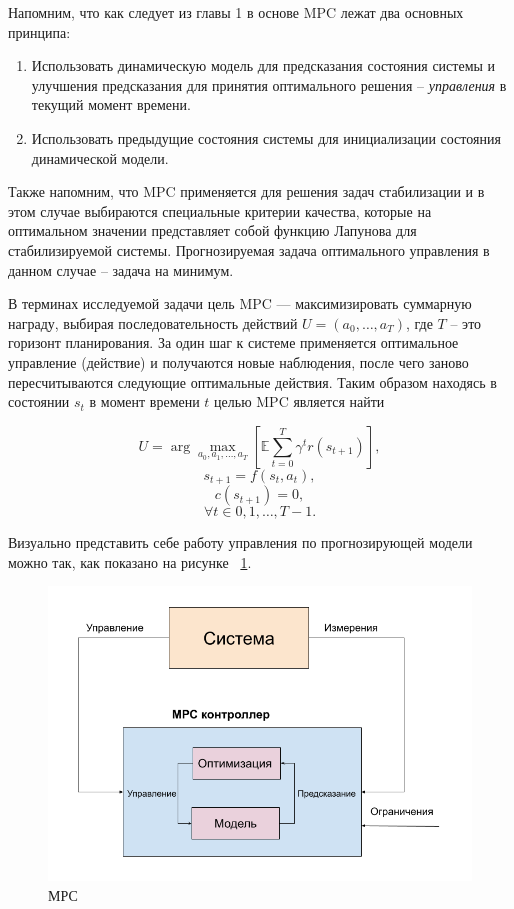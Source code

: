 Напомним, что как следует из главы 1 в основе MPC лежат два основных принципа:
\begin{enumerate}
	\item Использовать динамическую модель для предсказания состояния системы и улучшения предсказания для принятия оптимального решения -- \textit{управления} в текущий момент времени.
	
	\item Использовать предыдущие состояния системы для инициализации состояния динамической модели.
\end{enumerate}

Также напомним, что MPC применяется для решения задач стабилизации и в этом случае выбираются специальные критерии качества, которые на оптимальном значении представляет собой функцию Лапунова для стабилизируемой системы. Прогнозируемая задача оптимального управления в данном случае -- задача на минимум.

В терминах исследуемой задачи цель MPC — максимизировать суммарную награду, выбирая последовательность действий $U=(a_0, \dots, a_T)$, где $T$ -- это горизонт планирования. За один шаг к системе применяется оптимальное управление (действие) и  получаются новые наблюдения, после чего заново пересчитываются следующие оптимальные действия. Таким образом находясь в состоянии $s_t$ в момент времени $t$ целью MPC является найти

\begin{equation}
	U = \arg \max_{a_0, a_1, \dots, a_T} [ \mathbb{E}  \sum \limits_{t=0}^{T} \gamma^t r(s_{t+1})] , 
\end{equation}
$$s_{t+1} = f(s_t, a_t),$$
$$c(s_{t+1}) = 0,$$
$$\forall t \in {0, 1, \dots, T-1}. $$


Визуально представить себе работу управления по прогнозирующей модели можно так, как показано на рисунке ~\ref{fig:mpc-ex}. \newpage

\begin{figure}[h]
	\centering
	\includegraphics[scale=0.7]{mpc_ex.png}
	\caption{МРС}\label{fig:mpc-ex}
\end{figure}




